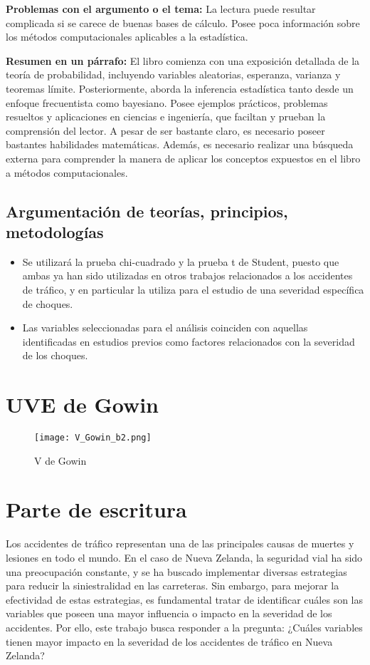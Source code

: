 \documentclass{book}
\begin{document}
\textbf{Problemas con el argumento o el tema:} La lectura puede resultar complicada si se carece de buenas bases de cálculo. Posee poca información sobre los métodos computacionales aplicables a la estadística.

\textbf{Resumen en un párrafo:} El libro comienza con una exposición detallada de la teoría de probabilidad, incluyendo variables aleatorias, esperanza, varianza y teoremas límite. Posteriormente, aborda la inferencia estadística tanto desde un enfoque frecuentista como bayesiano. Posee ejemplos prácticos, problemas resueltos y aplicaciones en ciencias e ingeniería, que faciltan y prueban la comprensión del lector. A pesar de ser bastante claro, es necesario poseer bastantes habilidades matemáticas. Además, es necesario realizar una búsqueda externa para comprender la manera de aplicar los conceptos expuestos en el libro a métodos computacionales.



\subsection{Argumentación de teorías, principios, metodologías}
\begin{itemize}
    \item Se utilizará la prueba chi-cuadrado y la prueba t de Student, puesto que ambas ya han sido utilizadas en otros trabajos relacionados a los accidentes de tráfico, y en particular \cite{GUNJAN2005} la utiliza para el estudio de una severidad específica de choques.
    \item Las variables seleccionadas para el análisis coinciden con aquellas identificadas en estudios previos como factores relacionados con la severidad de los choques.
\end{itemize}


\section{UVE de Gowin}

\begin{figure}[h]
\centering
\texttt{[image: V\_Gowin\_b2.png]}
\caption{\label{fig:Gowin}V de Gowin}
\end{figure}

\section{Parte de escritura}

Los accidentes de tráfico representan una de las principales causas de muertes y lesiones en todo el mundo. En el caso de Nueva Zelanda, la seguridad vial ha sido una preocupación constante, y se ha buscado implementar diversas estrategias para reducir la siniestralidad en las carreteras. Sin embargo, para mejorar la efectividad de estas estrategias, es fundamental tratar de identificar cuáles son las variables que poseen una mayor influencia o impacto en la severidad de los accidentes. Por ello, este trabajo busca responder a la pregunta: ¿Cuáles variables tienen mayor impacto en la severidad de los accidentes de tráfico en Nueva Zelanda?
\end{document}

